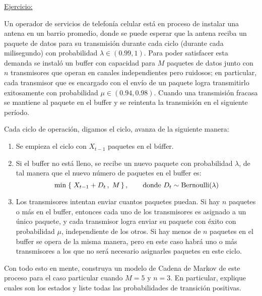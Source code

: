 \documentclass[ 10pt, xcolor = dvipsnames]{beamer}
\begin{document}
\begin{frame}[allowframebreaks]
\frametitle{\insertsubsection}

\underline{Ejercicio:}

Un operador de servicios de telefon\'ia celular est\'a en proceso de instalar una antena en un barrio promedio, donde se puede esperar que la antena reciba un paquete de datos para su transmisi\'on durante cada ciclo (\eg durante cada milisegundo) con probabilidad $\lambda \in (0.99,1)$. Para poder satisfacer esta demanda se instal\'o un buffer con capacidad para $M$ paquetes de datos junto con $n$ transmisores que operan en canales independientes pero ruidosos; en particular, cada transmisor \linebreak que es encargado con el env\'io de un paquete logra transmitirlo exitosamente con probabilidad $\mu \in (0.94,0.98)$. Cuando una transmisi\'on fracasa se mantiene al paquete en el buffer y se reintenta la transmisi\'on en el siguiente per\'iodo. 

Cada ciclo de operaci\'on, digamos el \tavo ciclo, avanza de la siguiente manera: 
\begin{enumerate}
\item Se empieza el ciclo con $X_{t-1}$ paquetes en el b\'uffer. 
\framebreak
\item Si el buffer no est\'a lleno, se recibe un nuevo paquete con probabilidad $\lambda$, \linebreak de tal manera que el nuevo n\'umero de paquetes en el buffer es: 
\[
\min \; \{ \; X_{t-1} + D_t \, , \; M \, \} \, ,
\qquad \text{donde } D_t \sim \text{Bernoulli}(\lambda)
\]
\item Los transmisores intentan enviar cuantos paquetes puedan. Si hay $n$ paquetes o m\'as en el buffer, entonces cada uno de los transmisores es asignado a un \'unico paquete, y cada transmisor logra enviar su paquete con \'exito con probabilidad $\mu$, independiente de los otros. Si hay menos de $n$ paquetes en \linebreak el buffer se opera de la misma manera, pero en este caso habr\'a uno o m\'as transmisores a los que no ser\'a necesario asignarles paquetes en este ciclo. 
\end{enumerate}

Con todo esto en mente, construya un modelo de Cadena de Markov de este proceso para el caso particular cuando $M = 5$ y $n = 3$. En particular, explique cuales son los estados y liste todas las probabilidades de transici\'on positivas. 

\end{frame}
\end{document}

